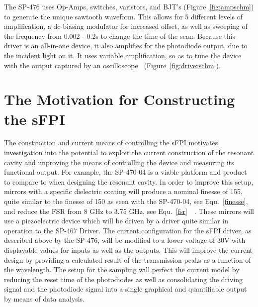 \documentclass[12pt]{report}
\begin{document}
The SP-476 uses Op-Amps, switches, varistors, and BJT's (Figure~\ref{fig:ampschm}) to generate the unique sawtooth waveform. This allows for 5 different levels of amplification, a dc-biasing modulator for increased offset, as well as sweeping of the frequency from 0.002 - 0.2s to change the time of the scan. Because this driver is an all-in-one device, it also amplifies for the photodiode output, due to the incident light on it. It uses variable amplification, so as to tune the device with the output captured by an oscilloscope~\cite{sfpidriver} (Figure~\ref{fig:driverschm}).


\chapter[Motivation]{The Motivation for Constructing the sFPI}
The construction and current means of controlling the sFPI motivates investigation into the potential to exploit the current construction of the resonant cavity and improving the means of controlling the device and measuring its functional output. For example, the SP-470-04 is a viable platform and product to compare to when designing the resonant cavity. In order to improve this setup, mirrors with a specific dielectric coating will produce a nominal finesse of 155, quite similar to the finesse of 150 as seen with the SP-470-04, see Equ.~\ref{finesse}, and reduce the FSR from 8 GHz to 3.75 GHz, see Equ.~\ref{fsr}~\cite{reich}~\cite{hercher}. These mirrors will use a piezoelectric device which will be driven by a driver quite similar in operation to the SP-467 Driver. The current configuration for the sFPI driver, as described above by the SP-476, will be modified to a lower voltage of 30V with displayable values for inputs as well as the outputs. This will improve the current design by providing a calculated result of the transmission peaks as a function of the wavelength. The setup for the sampling will perfect the current model by reducing the reset time of the photodiodes as well as consolidating the driving signal and the photodiode signal into a single graphical and quantifiable output by means of data analysis.


\end{document}
